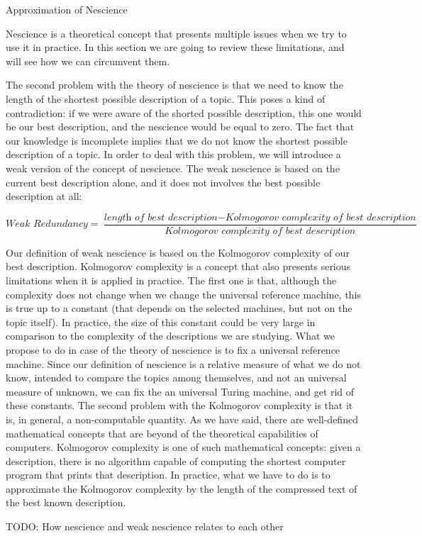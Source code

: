 {{\color{red} Approximation of Nescience}

Nescience is a theoretical concept that presents multiple issues when we try to use it in practice. In this section we are going to review these limitations, and will see how we can circumvent them.

The second problem with the theory of nescience is that we need to know the length of the shortest possible description of a topic. This poses a kind of contradiction: if we were aware of the shorted possible description, this one would be our best description, and the nescience would be equal to zero. The fact that our knowledge is incomplete implies that we do not know the shortest possible description of a topic. In order to deal with this problem, we will introduce a weak version of the concept of nescience. The weak nescience is based on the current best description alone, and it does not involves the best possible description at all:

\[
\textit{Weak Redundancy} = \frac{\textit{length of best description} - \textit{Kolmogorov complexity of best description}}{\textit{Kolmogorov complexity of best description}}
\]

Our definition of weak nescience is based on the Kolmogorov complexity of our best description. Kolmogorov complexity is a concept that also presents serious limitations when it is applied in practice. The first one is that, although the complexity does not change when we change the universal reference machine, this is true up to a constant (that depends on the selected machines, but not on the topic itself). In practice, the size of this constant could be very large in comparison to the complexity of the descriptions we are studying. What we propose to do in case of the theory of nescience is to fix a universal reference machine. Since our definition of nescience is a relative measure of what we do not know, intended to compare the topics among themselves, and not an universal measure of unknown, we can fix the an universal Turing machine, and get rid of these constants. The second problem with the Kolmogorov complexity is that it is, in general, a non-computable quantity. As we have said, there are well-defined mathematical concepts that are beyond of the theoretical capabilities of computers. Kolmogorov complexity is one of such mathematical concepts: given a description, there is no algorithm capable of computing the shortest computer program that prints that description. In practice, what we have to do is to approximate the Kolmogorov complexity by the length of the compressed text of the best known description.

TODO: How nescience and weak nescience relates to each other

}


